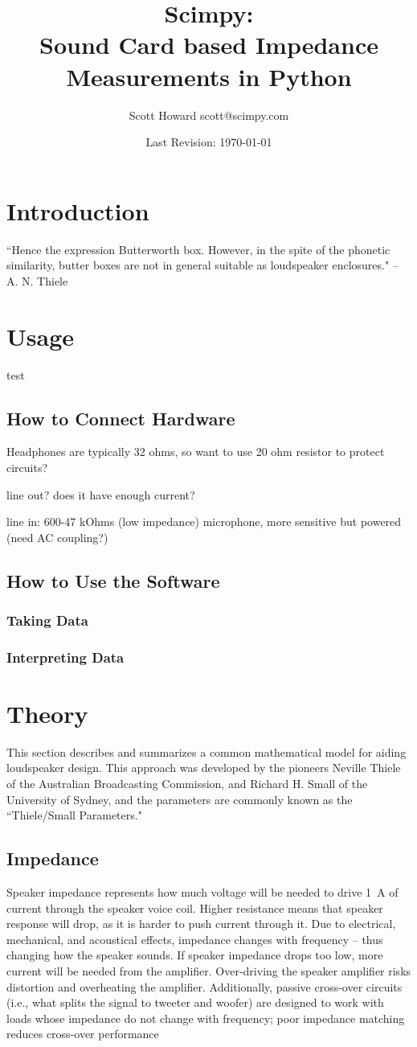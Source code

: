 \documentclass[10pt,letterpaper]{book}
\author{Scott Howard scott@scimpy.com}
\title{Scimpy:\\ \textbf{S}ound \textbf{C}ard based \textbf{I}mpedance \textbf{M}easurements in \textbf{Py}thon}
\date{Last Revision: \today}
\begin{document}
\layout
\maketitle
\tableofcontents
\chapter{Introduction}
``Hence the expression Butterworth box. However, in the spite of the phonetic similarity, butter boxes are not in general suitable as loudspeaker enclosures." -- A. N. Thiele
\chapter{Usage}
test
\section{How to Connect Hardware}
Headphones are typically 32 ohms, so want to use 20 ohm resistor to protect circuits?

line out? does it have enough current?

line in: 600-47 kOhms (low impedance)
microphone, more sensitive but powered (need AC coupling?)
\section{How to Use the Software}
\subsection{Taking Data}
\subsection{Interpreting Data}
\chapter{Theory}
This section describes and summarizes a common mathematical model for aiding loudspeaker design. This approach was developed by the pioneers Neville Thiele of the Australian Broadcasting Commission, and Richard H. Small of the University of Sydney, and the parameters are commonly known as the ``Thiele/Small Parameters."
\section{Impedance}\label{Impedance}
Speaker impedance represents how much voltage will be needed to drive 1~A of current  through the speaker voice coil. Higher resistance means that speaker response will drop, as it is harder to push current through it. Due to electrical, mechanical, and acoustical effects, impedance changes with frequency -- thus changing how the speaker sounds. If speaker impedance drops too low, more current will be needed from the amplifier. Over-driving the speaker amplifier risks distortion and overheating the amplifier. Additionally, passive cross-over circuits (i.e., what splits the signal to tweeter and woofer) are designed to work with loads whose impedance do not change with frequency; poor impedance matching reduces cross-over performance
\end{document}
